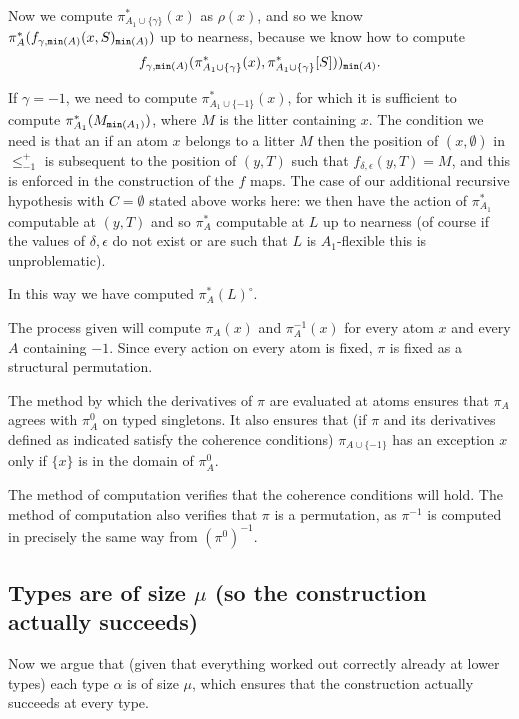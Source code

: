 \documentclass[112pt]{article}
\begin{document}
\begin{description}
Now we compute  $\pi^*_{A_1\cup \{\gamma\}}(x)$ as $\rho(x)$, and so we know  $\pi^*_A(f_{\gamma,{\tt min}(A)}(x,S)_{{\tt min}(A)})$ up to nearness, because we know how to compute $$f_{ \gamma,{\tt min}(A)}(\pi^*_{A_1\cup \{\gamma\}}(x),\pi^*_{A_1\cup \{\gamma\}}[S]))_{{\tt min}(A)}.$$

If $\gamma=-1$, we need to compute $\pi^*_{A_1\cup \{-1\}}(x)$, for which it is sufficient to compute $\pi^*_{A_1}(M_{{\tt min}(A_1)})$, where $M$ is the litter containing $x$.  The condition we need is that an if an atom $x$ belongs to a litter $M$ then the position of $(x,\emptyset)$ in
$\leq^+_{-1}$ is subsequent to the position of $(y,T)$ such that $f_{\delta,\epsilon}(y,T)=M$, and this is enforced in the construction of the $f$ maps.  The case of our additional recursive hypothesis with $C = \emptyset$ stated above works here:  we then have the action of $\pi^*_{A_1}$ computable at $(y,T)$ and so $\pi^*_A$ computable at $L$ up to nearness (of course if the values of $\delta, \epsilon$ do not exist or are such that $L$ is $A_1$-flexible this is unproblematic).

In this way we have computed $\pi^*_A(L)^\circ$. 

 The process given will compute $\pi_A(x)$ and $\pi_A^{-1}(x)$ for every atom $x$ and every $A$ containing $-1$.  Since every action on every atom is fixed, $\pi$ is fixed as a structural permutation.

The method by which the derivatives of $\pi$ are evaluated at atoms ensures that $\pi_A$ agrees with $\pi^0_A$ on typed singletons.  It also ensures that (if $\pi$ and its derivatives defined as indicated satisfy
the coherence conditions) $\pi_{A \cup \{-1\}}$ has an exception $x$ only if $\{x\}$ is in the domain of $\pi^0_A$.

The method of computation verifies that the coherence conditions will hold.  The method of computation also verifies that $\pi$ is a permutation, as $\pi^{-1}$ is computed in precisely the same way from $(\pi^0)^{-1}$.

\end{description}

\newpage
\subsection{Types are of size $\mu$ (so the construction actually succeeds)}

Now we argue that (given that everything worked out correctly already at lower types) each type $\alpha$ is of size $\mu$, which ensures
that the construction actually succeeds at every type.
\end{document}

